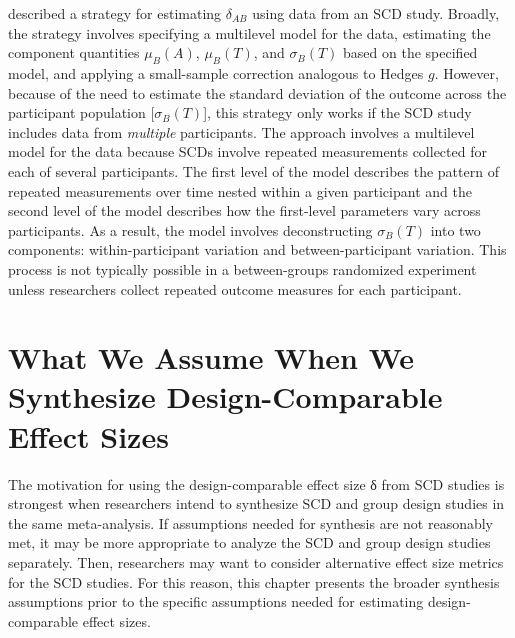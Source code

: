 \documentclass[
]{book}
\begin{document}
\citet{Pustejovsky2014design} described a strategy for estimating \(\delta_{AB}\) using data from an SCD study. Broadly, the strategy involves specifying a multilevel model for the data, estimating the component quantities \(\mu_B(A)\), \(\mu_B(T)\), and \(\sigma_B(T)\) based on the specified model, and applying a small-sample correction analogous to Hedges \(g\). However, because of the need to estimate the standard deviation of the outcome across the participant population {[}\(\sigma_B(T)\){]}, this strategy only works if the SCD study includes data from \emph{multiple} participants. The approach involves a multilevel model for the data because SCDs involve repeated measurements collected for each of several participants. The first level of the model describes the pattern of repeated measurements over time nested within a given participant and the second level of the model describes how the first-level parameters vary across participants. As a result, the model involves deconstructing \(\sigma_B(T)\) into two components: within-participant variation and between-participant variation. This process is not typically possible in a between-groups randomized experiment unless researchers collect repeated outcome measures for each participant.

\hypertarget{what-we-assume-when-we-synthesize-design-comparable-effect-sizes}{%
\section{What We Assume When We Synthesize Design-Comparable Effect Sizes}\label{what-we-assume-when-we-synthesize-design-comparable-effect-sizes}}

The motivation for using the design-comparable effect size δ from SCD studies is strongest when researchers intend to synthesize SCD and group design studies in the same meta-analysis. If assumptions needed for synthesis are not reasonably met, it may be more appropriate to analyze the SCD and group design studies separately. Then, researchers may want to consider alternative effect size metrics for the SCD studies. For this reason, this chapter presents the broader synthesis assumptions prior to the specific assumptions needed for estimating design-comparable effect sizes.
\end{document}
